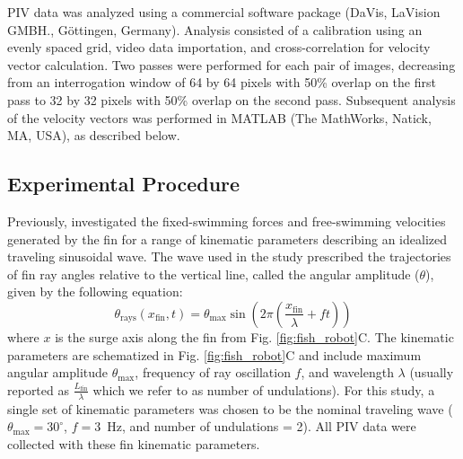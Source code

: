 \documentclass[onecolumn]{IEEEtran}
\begin{document}
PIV data was analyzed using a commercial software package (DaVis, LaVision
GMBH., G\"{o}ttingen, Germany). Analysis consisted of a calibration using
an evenly spaced grid, video data importation, and cross-correlation for
velocity vector calculation. Two passes were performed for each pair of
images, decreasing from an interrogation window of 64 by 64 pixels with
50\% overlap on the first pass to 32 by 32 pixels with 50\% overlap on the
second pass. Subsequent analysis of the velocity vectors was performed in
MATLAB (The MathWorks, Natick, MA, USA), as described below.

\subsection{Experimental Procedure}

Previously, \citet*{Cure11a} investigated the fixed-swimming forces and
free-swimming velocities generated by the fin for a range of kinematic
parameters describing an idealized traveling sinusoidal wave. The wave
used in the study prescribed the trajectories of fin ray angles relative
to the vertical line, called the angular amplitude ($\theta$), given by
the following equation:
\begin{equation} \theta_\text{rays}(x_\text{fin},t)=\theta_\text{max}
\sin \left( 2 \pi \left( \frac{x_\text{fin}}{\lambda}+ ft \right) \right) \label{eq:theta_waves}
\end{equation}
where $x$ is the surge axis along the fin from Fig. \ref{fig:fish_robot}C.
 The kinematic parameters are schematized in Fig. \ref{fig:fish_robot}C and
include maximum angular amplitude $\theta_\text{max}$, frequency of ray
oscillation $f$, and wavelength $\lambda$ (usually reported as
$\frac{L_\text{fin}}{\lambda}$ which we refer to as number of undulations). For this study, a single set of kinematic
parameters was chosen to be the nominal traveling wave ($\theta_\text{max} =
30^\circ$, $f = 3$~Hz, and number of undulations = 2). All PIV data
were collected with these fin kinematic parameters.
\end{document}
